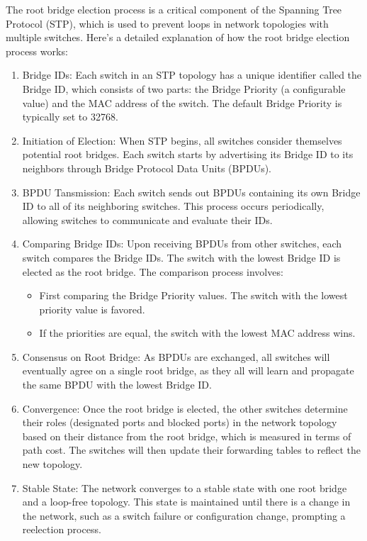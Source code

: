 \documentclass{article}
\begin{document}
The root bridge election process is a critical component of the Spanning Tree Protocol (STP), which is used to prevent loops in network topologies with multiple switches. Here’s a detailed explanation of how the root bridge election process works:
\begin{enumerate}[label=\roman*.]
\item Bridge IDs: Each switch in an STP topology has a unique identifier called the Bridge ID, which consists of two parts: the Bridge Priority (a configurable value) and the MAC address of the switch. The default Bridge Priority is typically set to 32768.
\item Initiation of Election: When STP begins, all switches consider themselves potential root bridges. Each switch starts by advertising its Bridge ID to its neighbors through Bridge Protocol Data Units (BPDUs).
\item BPDU Tansmission: Each switch sends out BPDUs containing its own Bridge ID to all of its neighboring switches. This process occurs periodically, allowing switches to communicate and evaluate their IDs.
\item Comparing Bridge IDs: Upon receiving BPDUs from other switches, each switch compares the Bridge IDs. The switch with the lowest Bridge ID is elected as the root bridge. The comparison process involves:
	\begin{itemize}
	\item First comparing the Bridge Priority values. The switch with the lowest priority value is favored.
	\item If the priorities are equal, the switch with the lowest MAC address wins.
	\end{itemize}
\item Consensus on Root Bridge: As BPDUs are exchanged, all switches will eventually agree on a single root bridge, as they all will learn and propagate the same BPDU with the lowest Bridge ID.
\item Convergence: Once the root bridge is elected, the other switches determine their roles (designated ports and blocked ports) in the network topology based on their distance from the root bridge, which is measured in terms of path cost. The switches will then update their forwarding tables to reflect the new topology.
\item Stable State: The network converges to a stable state with one root bridge and a loop-free topology. This state is maintained until there is a change in the network, such as a switch failure or configuration change, prompting a reelection process.
\end{enumerate}
\end{document}
